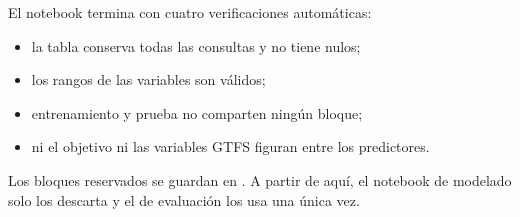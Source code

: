 El notebook termina con cuatro verificaciones automáticas:
\begin{itemize}
  \item la tabla conserva todas las consultas y no tiene nulos;
  \item los rangos de las variables son válidos;
  \item entrenamiento y prueba no comparten ningún bloque;
  \item ni el objetivo ni las variables GTFS figuran entre los predictores.
\end{itemize}
Los bloques reservados se guardan en . A partir de aquí, el notebook
de modelado solo los descarta y el de evaluación los usa una única vez.
